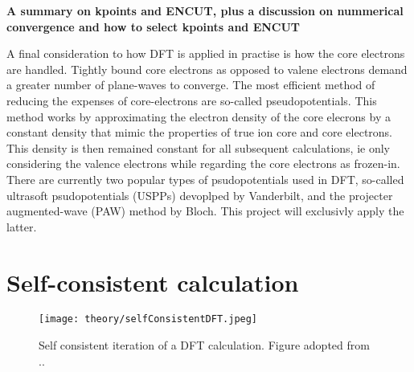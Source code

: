\textbf{A summary on kpoints and ENCUT, plus a discussion on nummerical convergence and how to select kpoints and ENCUT}


A final consideration to how DFT is applied in practise is how the core electrons are handled. Tightly bound core electrons as opposed to valene electrons demand a greater number of plane-waves to converge. The most efficient method of reducing the expenses of core-electrons are so-called pseudopotentials. This method works by approximating the electron density of the core elecrons by a constant density that mimic the properties of true ion core and core electrons. This density is then remained constant for all subsequent calculations, ie only considering the valence electrons while regarding the core electrons as frozen-in. There are currently two popular types of psudopotentials used in DFT, so-called ultrasoft psudopotentials (USPPs) devoplped by Vanderbilt, and the projecter augmented-wave (PAW) method by Bloch. This project will exclusivly apply the latter. 

\section{Self-consistent calculation}

\begin{figure}
\centering
\texttt{[image: theory/selfConsistentDFT.jpeg]}
\caption{Self consistent iteration of a DFT calculation. Figure adopted from ..}
\label{sfDFT}
\end{figure}